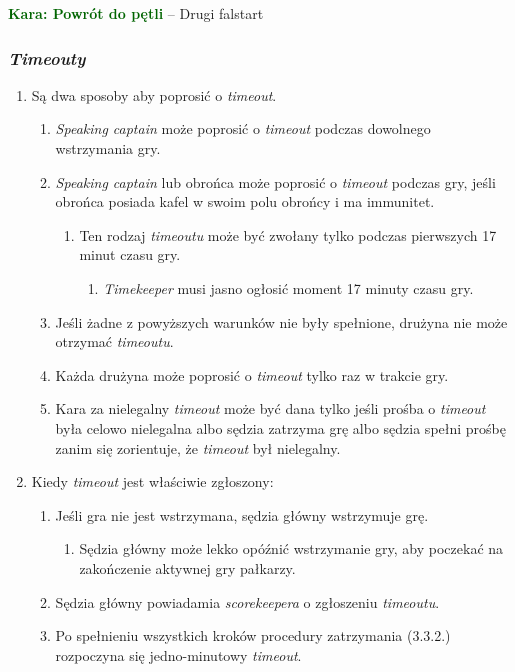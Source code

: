 \documentclass[11pt,a4paper]{article}
\newcommand\penaltyd[2]{\bgroup\textcolor{darkgreen}{\textbf{Kara: #1}} -- #2}
\begin{document}
\penaltyd{Powrót do pętli}{Drugi falstart}

\subsubsection{\emph{Timeouty}}
\begin{enumerate}
  \item Są dwa sposoby aby poprosić o \emph{timeout}.
  \begin{enumerate}
    \item \emph{Speaking captain} może poprosić o \emph{timeout} podczas dowolnego wstrzymania gry.
    \item \emph{Speaking captain} lub obrońca może poprosić o \emph{timeout} podczas gry, jeśli obrońca posiada kafel w swoim polu obrońcy i ma immunitet.
    \begin{enumerate}
      \item Ten rodzaj \emph{timeoutu} może być zwołany tylko podczas pierwszych 17 minut czasu gry.
      \begin{enumerate}
        \item \emph{Timekeeper} musi jasno ogłosić moment 17 minuty czasu gry.
      \end{enumerate}
    \end{enumerate}
    \item Jeśli żadne z powyższych warunków nie były spełnione, drużyna nie może otrzymać \emph{timeoutu}.
    \item Każda drużyna może poprosić o \emph{timeout} tylko raz w trakcie gry.
    \item Kara za nielegalny \emph{timeout} może być dana tylko jeśli prośba o \emph{timeout} była celowo nielegalna albo sędzia zatrzyma grę albo sędzia spełni prośbę zanim się zorientuje, że \emph{timeout} był nielegalny.
  \end{enumerate}
  \item Kiedy \emph{timeout} jest właściwie zgłoszony:
  \begin{enumerate}
    \item Jeśli gra nie jest wstrzymana, sędzia główny wstrzymuje grę.
    \begin{enumerate}
      \item Sędzia główny może lekko opóźnić wstrzymanie gry, aby poczekać na zakończenie aktywnej gry pałkarzy.
    \end{enumerate}
    \item Sędzia główny powiadamia \emph{scorekeepera} o zgłoszeniu \emph{timeoutu}.
    \item Po spełnieniu wszystkich kroków procedury zatrzymania (3.3.2.) rozpoczyna się jedno-minutowy \emph{timeout}. %

\end{enumerate}
\end{enumerate}
\end{document}
